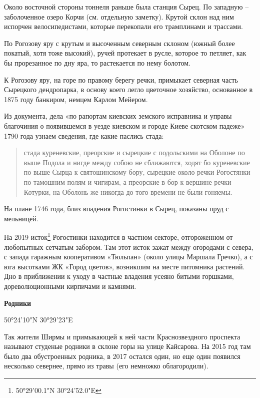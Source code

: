 Около восточной стороны тоннеля раньше была станция Сырец. По западную – заболоченное озеро Корчи (см. отдельную заметку). Крутой склон над ним испорчен велосипедистами, которые перекопали его трамплинами и трассами.

По Рогозову яру с крутым и высоченным северным склоном (южный более покатый, хотя тоже высокий), ручей протекает в русле, которое то петляет, как бы прорезанное по дну яра, то растекается по нему болотом.

К Рогозову яру, на горе по правому берегу речки, примыкает северная часть Сырецкого дендропарка, в основу коего легло цветочное хозяйство, основанное в 1875 году банкиром, немцем Карлом Мейером.

Из документа, дела «по рапортам киевских земского исправника и управы благочиния о появившемся в уезде киевском и городе Киеве скотском падеже» 1790 года узнаем сведения, где какие паслись стада:

\begin{quotation}
стада куреневские, преорские и сырецкие с подольскими на Оболоне по выше Подола и нигде между собою не сближаются, ходят бо куреневские по выше Сырца к святошинскому бору, сырецкие около речки Рогостянки по тамошним полям и чигирам, а преорские в бор к вершине речки Котурки, на Оболонь же никогда до того времени не были гоняемы.
\end{quotation}

На плане 1746 года, близ впадения Рогостинки в Сырец, показаны пруд с мельницей.

На 2019 исток\footnote{50°29'00.1"N 30°24'52.0"E} Рогостинки находится в частном секторе, отгороженном от любопытных сетчатым забором. Там этот исток зажат между огородами с севера, с запада гаражным кооперативом «Тюльпан» (около улицы Маршала Гречко), а с юга высотками ЖК «Город цветов», возникшим на месте питомника растений. Дно в приближении к уходу в частные владения усеяно битыми горшками, дореволюционными кирпичами и камнями.\\ 

\medskip

\textbf{Родники}

50°24'10"N 30°29'23"E

Так жители Ширмы и примыкающей к ней части Краснозвездного проспекта называют студеные родники в склоне горы на улице Кайсарова. На 2015 год там было два обустроенных родника, в 2017 остался один, но еще один появился несколько севернее, прямо из травы (его немножко облагородили).\\

